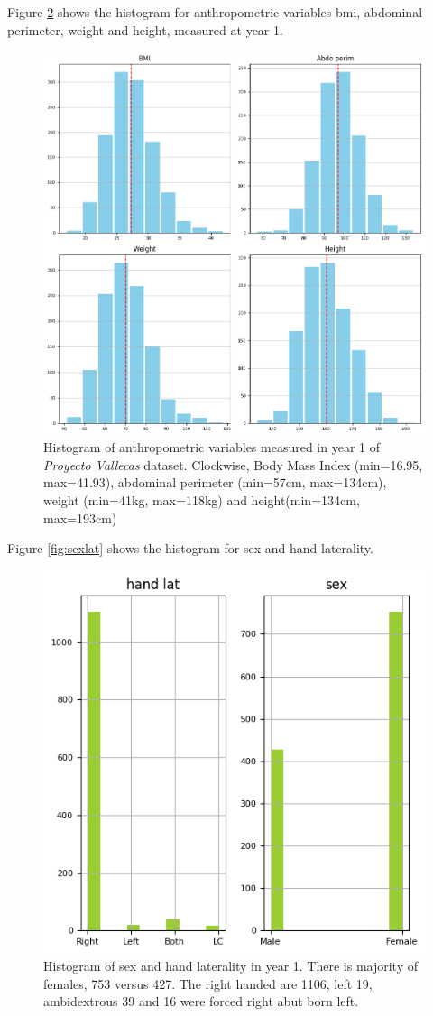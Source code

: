 \documentclass[11pt]{article}
\theoremstyle{definition}
\theoremstyle{remark}
\begin{document}
Figure \ref{fig:anthro} shows the histogram for anthropometric variables bmi, abdominal perimeter, weight and height, measured at year 1.
\begin{figure}[H]
        \centering
        \includegraphics[keepaspectratio, width=0.5\linewidth]{figures/Fig_anthro}
        \caption{Histogram of anthropometric variables measured in year 1 of \emph{Proyecto Vallecas} dataset. Clockwise, Body Mass Index (min=16.95, max=41.93), abdominal perimeter (min=57cm, max=134cm), weight (min=41kg, max=118kg) and height(min=134cm, max=193cm)} 
        \label{fig:anthro}
\end{figure}

Figure \ref{fig:sexlat} shows the histogram for sex and hand laterality.
\begin{figure}[H]
        \centering
        \includegraphics[keepaspectratio, width=0.5\linewidth]{figures/Fig_sexlat}
        \caption{Histogram of sex and hand laterality in year 1. There is majority of females, 753 versus 427. The right handed are 1106, left 19, ambidextrous 39 and 16 were forced right abut born left.} 
        \label{fig:anthro}
\end{figure}
\end{document}
